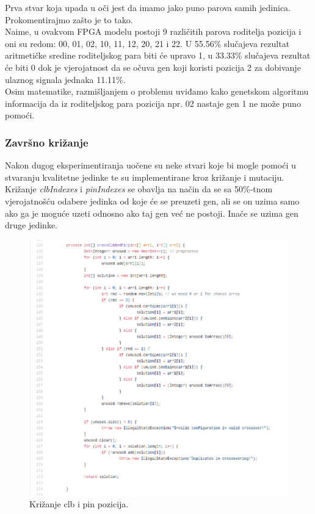 \documentclass[times, utf8, zavrsni]{fer}
\begin{document}
	Prva stvar koja upada u oči jest da imamo jako puno parova samih jedinica. Prokomentirajmo zašto je to tako. \\
	Naime, u ovakvom FPGA modelu postoji 9 različitih parova roditelja pozicija i oni su redom: 00, 01, 02, 10, 11, 12, 20, 21 i 22. U 55.56\% slučajeva rezultat aritmetičke sredine roditeljskog para biti će upravo 1, u 33.33\% slučajeva rezultat će biti 0 dok je vjerojatnost da se očuva gen koji koristi pozicija 2 za dobivanje ulaznog signala jednaka 11.11\%. \\ 
	Osim matematike, razmišljanjem o problemu uviđamo kako genetskom algoritmu informacija da iz roditeljskog para pozicija npr. 02 nastaje gen 1 ne može puno pomoći. 
	
	
	\subsubsection{Završno križanje}
	\label{ValidCrosser}
	
	Nakon dugog eksperimentiranja uočene su neke stvari koje bi mogle pomoći u stvaranju kvalitetne jedinke te su implementirane kroz križanje i mutaciju. Križanje \emph{clbIndexes} i \emph{pinIndexes} se obavlja na način da se sa 50\%-tnom vjerojatnošću odabere jedinka od koje će se preuzeti gen, ali se on uzima samo ako ga je moguće uzeti odnosno ako taj gen već ne postoji. Inače se uzima gen druge jedinke.
	
	
	\begin{figure}[H]
		\centering
		\includegraphics[width=18cm]{slike/crossClbAndPin.png}
		\caption{Križanje clb i pin pozicija.}
		\label{fig:clb-and-pin-positions}
	\end{figure} 
	
\end{document}

